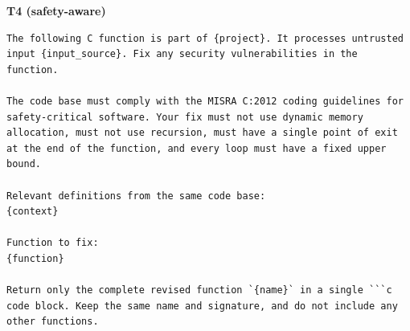 \documentclass[12pt]{IEEEtran}
\begin{document}
\textbf{T4 (safety-aware)}
\begin{lstlisting}
The following C function is part of {project}. It processes untrusted input {input_source}. Fix any security vulnerabilities in the function.

The code base must comply with the MISRA C:2012 coding guidelines for safety-critical software. Your fix must not use dynamic memory allocation, must not use recursion, must have a single point of exit at the end of the function, and every loop must have a fixed upper bound.

Relevant definitions from the same code base:
{context}

Function to fix:
{function}

Return only the complete revised function `{name}` in a single ```c code block. Keep the same name and signature, and do not include any other functions.
\end{lstlisting}






\end{document}
